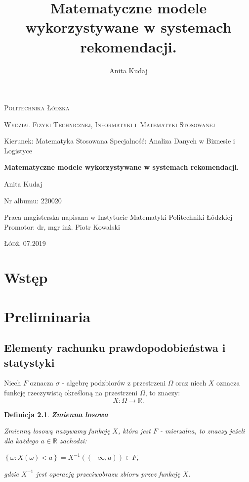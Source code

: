 \documentclass[12pt,a4paper]{report}
\author{Anita Kudaj}
\title{Matematyczne modele wykorzystywane w systemach rekomendacji.}
\newtheorem{df}{Definicja}[chapter]
\newcommand{\setR}{\mathbb{R}}
\newcommand{\set}[1]{\left\lbrace {#1} \right\rbrace}
\begin{document}
\begin{titlepage}
\begin{flushleft}
\end{flushleft}
\begin{center}
\textsc{{\huge Politechnika Łódzka}}
\end{center}
\bigskip
\bigskip
\begin{center}
\textsc{{\Large Wydział Fizyki Technicznej, Informatyki i~Matematyki Stosowanej}}
\end{center}
\bigskip
\bigskip
\begin{Large}
Kierunek: Matematyka Stosowana
Specjalność: Analiza Danych w Biznesie i Logistyce

\end{Large}
\bigskip
\bigskip
\noindent\hrulefill
\begin{center}
{\textbf{{\Large Matematyczne modele wykorzystywane w systemach rekomendacji.}}}
\end{center}
\begin{flushright}
{\large 
Anita Kudaj

Nr albumu: 
220020
}
\end{flushright}
\noindent\hrulefill
\bigskip
\bigskip
\begin{center}
{\large Praca magisterska
napisana w Instytucie Matematyki Politechniki Łódzkiej 
\bigskip
\bigskip
\bigskip
\bigskip
Promotor: dr, mgr inż. Piotr Kowalski
 }
\end{center}
\bigskip
\bigskip
\bigskip
\bigskip
\begin{center}
{\textsc{\large Łódź, 07.2019}}
\end{center}
\end{titlepage}


\tableofcontents


\chapter{Wstęp}
\chapter{Preliminaria} %
\section{Elementy rachunku prawdopodobieństwa i statystyki}
Niech $F$ oznacza $\sigma$ - algebrę podzbiorów z przestrzeni $\Omega$ oraz niech $X$ oznacza funkcję rzeczywistą określoną na przestrzeni $\Omega$, to znaczy: %
$$
X: \Omega \longrightarrow \setR.
$$
\begin{df}\textbf{Zmienna losowa}%

Zmienną losową nazywamy funkcję $X$, która jest $F$ - mierzalna, to znaczy jeżeli dla każdego $a\in\mathbb{R}$ zachodzi:
\begin{center}
$\set{\omega : X(\omega) < a} = X^{-1}((-\infty,a))\in F$, 
\end{center}
gdzie $X^{-1}$ jest operacją przeciwobrazu zbioru przez funkcję $X$.
\end{df}
\end{document}
